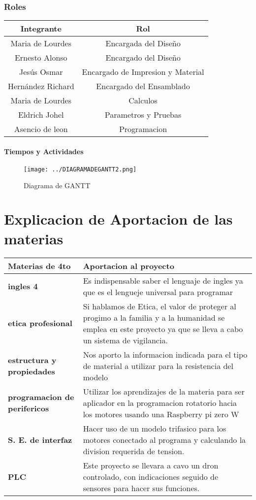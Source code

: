 \documentclass[11pt,a4paper]{article}
\begin{document}
\section{Roles}

\begin{tabular}{|c|c|}

\hline
\textbf{Integrante} & \textbf{Rol} \\ \hline
Maria de Lourdes  & Encargada del Diseño \\ \hline
Ernesto Alonso & Encargado del Diseño \\ \hline
Jesús Osmar & Encargado de Impresion y Material \\ \hline
Hernández Richard & Encargado del Ensamblado \\ \hline
Maria de Lourdes & Calculos \\ \hline
Eldrich Johel & Parametros y Pruebas \\ \hline
Asencio de leon & Programacion \\ \hline
\end{tabular}

\subsection{Tiempos y Actividades}

\begin{figure}[h]
\centering
\texttt{[image: ../DIAGRAMADEGANTT2.png]} 
\caption{Diagrama de GANTT}
\end{figure}


\newpage

\part{Explicacion de Aportacion de las materias}

\begin{tabular}{|p{5.5cm}|p{7cm}|}
\hline 
\textbf{Materias de 4to} & \textbf{Aportacion al proyecto} \\ \hline
\textbf{ingles 4} & Es indispensable saber el lenguaje de  ingles ya que es el lengueje universal para programar \\ \hline
\textbf{etica profesional} & Si hablamos de Etica, el valor de proteger al progimo a la familia y a la humanidad  se emplea en este proyecto ya que se lleva a cabo un sistema de vigilancia. \\ \hline
\textbf{estructura y propiedades} & Nos aporto la informacion indicada para el tipo de material a utilizar para la resistencia  del modelo \\ \hline
\textbf{programacion de perifericos} & Utilizar los aprendizajes de la materia para ser aplicador en la programacion rotatorio hacia los motores usando una Raspberry pi zero W \\ \hline
\textbf{S. E. de interfaz} & Hacer uso de un modelo trifasico para los motores conectado al programa y calculando la division requerida de tension.  \\ \hline
\textbf{PLC} & Este proyecto se llevara a cavo un dron controlado, con indicaciones seguido de sensores para hacer sus funciones. \\ \hline
\end{tabular}
\end{document}
